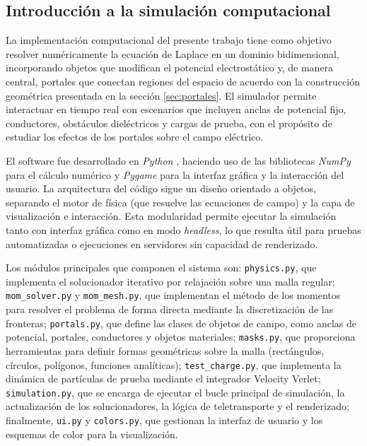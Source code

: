 \documentclass[12pt, twocolumn]{article}
\begin{document}
\subsection{Introducción a la simulación computacional}

La implementación computacional del presente trabajo tiene como objetivo resolver numéricamente la ecuación de Laplace en un dominio bidimensional, incorporando objetos que modifican el potencial electrostático y, de manera central, portales que conectan regiones del espacio de acuerdo con la construcción geométrica presentada en la sección \ref{sec:portales}. El simulador permite interactuar en tiempo real con escenarios que incluyen anclas de potencial fijo, conductores, obstáculos dieléctricos y cargas de prueba, con el propósito de estudiar los efectos de los portales sobre el campo eléctrico.

El software fue desarrollado en \textit{Python} \cite{Python}, haciendo uso de las bibliotecas \textit{NumPy} \cite{NumPy} para el cálculo numérico y \textit{Pygame} \cite{Pygame} para la interfaz gráfica y la interacción del usuario. La arquitectura del código sigue un diseño orientado a objetos, separando el motor de física (que resuelve las ecuaciones de campo) y la capa de visualización e interacción. Esta modularidad permite ejecutar la simulación tanto con interfaz gráfica como en modo \textit{headless}, lo que resulta útil para pruebas automatizadas o ejecuciones en servidores sin capacidad de renderizado.

Los módulos principales que componen el sistema son: \texttt{physics.py}, que implementa el solucionador iterativo por relajación sobre una malla regular; \texttt{mom\_solver.py} y \texttt{mom\_mesh.py}, que implementan el método de los momentos para resolver el problema de forma directa mediante la discretización de las fronteras; \texttt{portals.py}, que define las clases de objetos de campo, como anclas de potencial, portales, conductores y objetos materiales; \texttt{masks.py}, que proporciona herramientas para definir formas geométricas sobre la malla (rectángulos, círculos, polígonos, funciones analíticas); \texttt{test\_charge.py}, que implementa la dinámica de partículas de prueba mediante el integrador Velocity Verlet; \texttt{simulation.py}, que se encarga de ejecutar el bucle principal de simulación, la actualización de los solucionadores, la lógica de teletransporte y el renderizado; finalmente, \texttt{ui.py} y \texttt{colors.py}, que gestionan la interfaz de usuario y los esquemas de color para la visualización.
\end{document}
